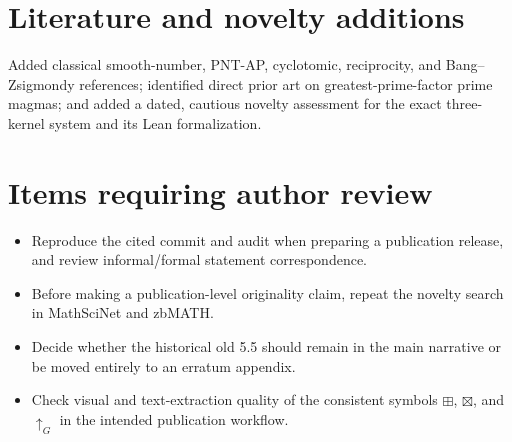 \documentclass[11pt,a4paper,oneside,open=any,headings=small]{scrbook}
\theoremstyle{definition}
\newcommand{\gexp}{\mathbin{\uparrow_{G}}}
\begin{document}
\section*{Literature and novelty additions}
Added classical smooth-number, PNT-AP, cyclotomic, reciprocity, and Bang--Zsigmondy references; identified direct prior art on greatest-prime-factor prime magmas; and added a dated, cautious novelty assessment for the exact three-kernel system and its Lean formalization.

\section*{Items requiring author review}
\begin{itemize}
\item Reproduce the cited commit and audit when preparing a publication release, and review informal/formal statement correspondence.
\item Before making a publication-level originality claim, repeat the novelty search in MathSciNet and zbMATH.
\item Decide whether the historical old 5.5 should remain in the main narrative or be moved entirely to an erratum appendix.
\item Check visual and text-extraction quality of the consistent symbols $\boxplus$, $\boxtimes$, and $\gexp$ in the intended publication workflow.
\end{itemize}

\backmatter
\printbibliography[heading=bibintoc,title={Bibliography}]
\end{document}
